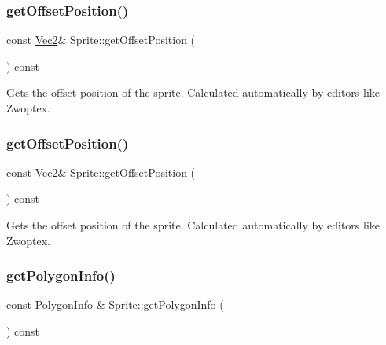 \subsubsection{\texorpdfstring{get\+Offset\+Position()}{getOffsetPosition()}\hspace{0.1cm}{\footnotesize\ttfamily [1/2]}}
{\footnotesize\ttfamily const \hyperlink{classVec2}{Vec2}\& Sprite\+::get\+Offset\+Position (\begin{DoxyParamCaption}{ }\end{DoxyParamCaption}) const\hspace{0.3cm}{\ttfamily [inline]}}

Gets the offset position of the sprite. Calculated automatically by editors like Zwoptex. \mbox{\label{classSprite_a783cd2206e8da661869af7a49ad41d7c}} 
\subsubsection{\texorpdfstring{get\+Offset\+Position()}{getOffsetPosition()}\hspace{0.1cm}{\footnotesize\ttfamily [2/2]}}
{\footnotesize\ttfamily const \hyperlink{classVec2}{Vec2}\& Sprite\+::get\+Offset\+Position (\begin{DoxyParamCaption}{ }\end{DoxyParamCaption}) const\hspace{0.3cm}{\ttfamily [inline]}}

Gets the offset position of the sprite. Calculated automatically by editors like Zwoptex. \mbox{\label{classSprite_a9beedbe83484db30d0fe595b3d12d5e9}} 
\subsubsection{\texorpdfstring{get\+Polygon\+Info()}{getPolygonInfo()}\hspace{0.1cm}{\footnotesize\ttfamily [1/2]}}
{\footnotesize\ttfamily const \hyperlink{classPolygonInfo}{Polygon\+Info} \& Sprite\+::get\+Polygon\+Info (\begin{DoxyParamCaption}{ }\end{DoxyParamCaption}) const}

